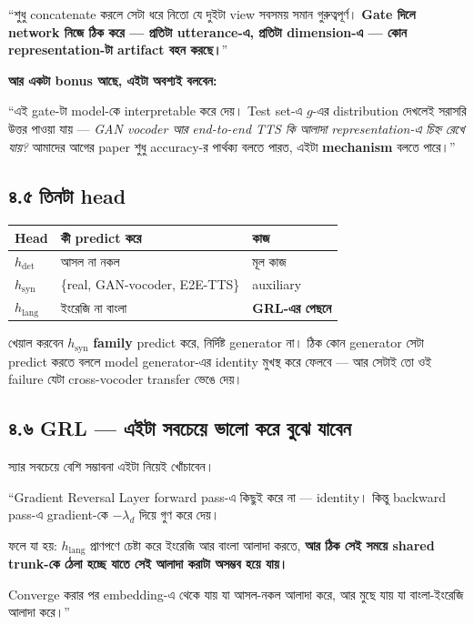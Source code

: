 \documentclass[11pt,a4paper]{article}
\newenvironment{say}{%
  \def\FrameCommand{\textcolor{barcol}{\vrule width 3pt}\hspace{8pt}}%
  \MakeFramed{\advance\hsize-\width \FrameRestore}%
}{\endMakeFramed}
\begin{document}
\begin{say}
``শুধু concatenate করলে সেটা ধরে নিতো যে দুইটা view সবসময় সমান গুরুত্বপূর্ণ।
\textbf{Gate দিলে network নিজে ঠিক করে --- প্রতিটা utterance-এ, প্রতিটা
dimension-এ --- কোন representation-টা artifact বহন করছে।}''
\end{say}

\textbf{আর একটা bonus আছে, এইটা অবশ্যই বলবেন:}

\begin{say}
``এই gate-টা model-কে interpretable করে দেয়। Test set-এ $g$-এর distribution
দেখলেই সরাসরি উত্তর পাওয়া যায় --- \emph{GAN vocoder আর end-to-end TTS কি আলাদা
representation-এ চিহ্ন রেখে যায়?} আমাদের আগের paper শুধু accuracy-র পার্থক্য
বলতে পারত, এইটা \textbf{mechanism} বলতে পারে।''
\end{say}

\subsection*{৪.৫ তিনটা head}

\begin{center}
\begin{tabularx}{\textwidth}{@{}l >{\raggedright\arraybackslash}X l@{}}
\toprule
\textbf{Head} & \textbf{কী predict করে} & \textbf{কাজ} \\
\midrule
$h_\mathrm{det}$  & আসল না নকল & মূল কাজ \\
$h_\mathrm{syn}$  & \{real, GAN-vocoder, E2E-TTS\} & auxiliary \\
$h_\mathrm{lang}$ & ইংরেজি না বাংলা & \textbf{GRL-এর পেছনে} \\
\bottomrule
\end{tabularx}
\end{center}

খেয়াল করবেন $h_\mathrm{syn}$ \textbf{family} predict করে, নির্দিষ্ট generator না।
ঠিক কোন generator সেটা predict করতে বললে model generator-এর identity মুখস্থ করে
ফেলবে --- আর সেটাই তো ওই failure যেটা cross-vocoder transfer ভেঙে দেয়।

\subsection*{৪.৬ GRL --- এইটা সবচেয়ে ভালো করে বুঝে যাবেন}

স্যার সবচেয়ে বেশি সম্ভাবনা এইটা নিয়েই খোঁচাবেন।

\begin{say}
``Gradient Reversal Layer forward pass-এ কিছুই করে না --- identity। কিন্তু
backward pass-এ gradient-কে $-\lambda_d$ দিয়ে গুণ করে দেয়।

\vspace{4pt}
ফলে যা হয়: $h_\mathrm{lang}$ প্রাণপণে চেষ্টা করে ইংরেজি আর বাংলা আলাদা করতে,
\textbf{আর ঠিক সেই সময়ে shared trunk-কে ঠেলা হচ্ছে যাতে সেই আলাদা করাটা অসম্ভব
হয়ে যায়।}

\vspace{4pt}
Converge করার পর embedding-এ থেকে যায় যা আসল-নকল আলাদা করে, আর মুছে যায় যা
বাংলা-ইংরেজি আলাদা করে।''
\end{say}
\end{document}
